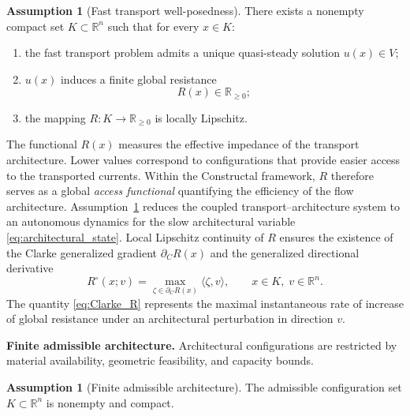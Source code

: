 \documentclass[12pt]{article}
\theoremstyle{plain}
\theoremstyle{definition}
\newtheorem{assumption}[theorem]{Assumption}
\theoremstyle{remark}
\begin{document}
\begin{assumption}[Fast transport well-posedness]
\label{ass:timescale}
There exists a nonempty compact set $K\subset\mathbb{R}^n$
such that for every $x\in K$:
\begin{enumerate}[label=(\roman*),leftmargin=2.2em]
\item the fast transport problem admits a unique quasi-steady solution
      $u(x)\in V$;
\item $u(x)$ induces a finite global resistance
      \begin{equation}
      R(x)\in\mathbb{R}_{\ge 0};
      \label{eq:resistance_function}
      \end{equation}
\item the mapping
      \(
      R:K\to\mathbb{R}_{\ge 0}
      \)
      is locally Lipschitz.
\end{enumerate}
\end{assumption}

The functional $R(x)$ measures the effective impedance of the
transport architecture.
Lower values correspond to configurations that provide easier access
to the transported currents.
Within the Constructal framework, $R$ therefore serves as a global
\emph{access functional} quantifying the efficiency of the flow
architecture. Assumption~\ref{ass:timescale} reduces the coupled
transport–architecture system to an autonomous dynamics for the slow
architectural variable \eqref{eq:architectural_state}.
Local Lipschitz continuity of $R$ ensures the existence of the Clarke
generalized gradient $\partial_C R(x)$ and the generalized directional
derivative
\begin{equation}
R^{\circ}(x;v)
=
\max_{\zeta\in\partial_C R(x)}
\langle \zeta,v\rangle,
\qquad x\in K,\; v\in\mathbb{R}^n.
\label{eq:Clarke_R}
\end{equation}
The quantity \eqref{eq:Clarke_R} represents the maximal instantaneous
rate of increase of global resistance under an architectural
perturbation in direction $v$.

\medskip

\noindent
\textbf{Finite admissible architecture.} Architectural configurations are restricted by material availability,
geometric feasibility, and capacity bounds.

\begin{assumption}[Finite admissible architecture]
\label{ass:finite_architecture}
The admissible configuration set $K\subset\mathbb{R}^n$
is nonempty and compact.
\end{assumption}
\end{document}
